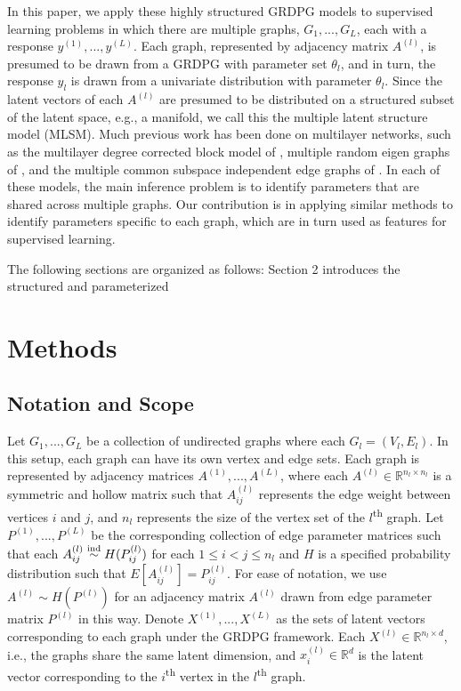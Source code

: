 \documentclass[12pt]{article}
\begin{document}
In this paper, we apply these highly structured GRDPG models to
supervised learning problems in which there are multiple graphs,
\(G_1, ..., G_L\), each with a response \(y^{(1)}, ..., y^{(L)}\). Each
graph, represented by adjacency matrix \(A^{(l)}\), is presumed to be
drawn from a GRDPG with parameter set \(\theta_l\), and in turn, the
response \(y_l\) is drawn from a univariate distribution with parameter
\(\theta_l\). Since the latent vectors of each \(A^{(l)}\) are presumed
to be distributed on a structured subset of the latent space, e.g., a
manifold, we call this the multiple latent structure model (MLSM). Much
previous work has been done on multilayer networks, such as the
multilayer degree corrected block model of \citet{agterberg2022joint},
multiple random eigen graphs of \citet{8889404}, and the multiple common
subspace independent edge graphs of \citet{arroyo2020inference}. In each
of these models, the main inference problem is to identify parameters
that are shared across multiple graphs. Our contribution is in applying
similar methods to identify parameters specific to each graph, which are
in turn used as features for supervised learning.

The following sections are organized as follows: Section 2 introduces
the structured and parameterized

\hypertarget{methods}{%
\section{Methods}\label{methods}}

\hypertarget{notation-and-scope}{%
\subsection{Notation and Scope}\label{notation-and-scope}}

Let \(G_1, ..., G_L\) be a collection of undirected graphs where each
\(G_l = (V_l, E_l)\). In this setup, each graph can have its own vertex
and edge sets. Each graph is represented by adjacency matrices
\(A^{(1)}, ..., A^{(L)}\), where each
\(A^{(l)} \in \mathbb{R}^{n_l \times n_l}\) is a symmetric and hollow
matrix such that \(A^{(l)}_{ij}\) represents the edge weight between
vertices \(i\) and \(j\), and \(n_l\) represents the size of the vertex
set of the \(l\)\textsuperscript{th} graph. Let
\(P^{(1)}, ..., P^{(L)}\) be the corresponding collection of edge
parameter matrices such that each
\(A^{(l)}_{ij} \stackrel{\mathrm{ind}}{\sim} H(P^{(l)}_{ij})\) for each
\(1 \leq i < j \leq n_l\) and \(H\) is a specified probability
distribution such that \(E[A^{(l)}_{ij}] = P^{(l)}_{ij}\). For ease of
notation, we use \(A^{(l)} \sim H(P^{(l)})\) for an adjacency matrix
\(A^{(l)}\) drawn from edge parameter matrix \(P^{(l)}\) in this way.
Denote \(X^{(1)}, ..., X^{(L)}\) as the sets of latent vectors
corresponding to each graph under the GRDPG framework. Each
\(X^{(l)} \in \mathbb{R}^{n_l \times d}\), i.e., the graphs share the
same latent dimension, and \(x_i^{(l)} \in \mathbb{R}^d\) is the latent
vector corresponding to the \(i\)\textsuperscript{th} vertex in the
\(l\)\textsuperscript{th} graph.
\end{document}
